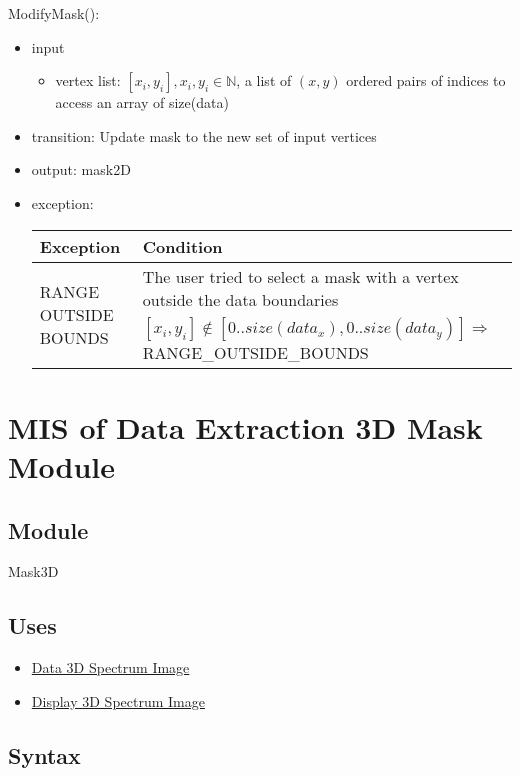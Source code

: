 \documentclass[12pt, titlepage]{article}
\begin{document}
\noindent ModifyMask():
\begin{itemize}
    \item input
    \begin{itemize}
        \item vertex list: $[x_i, y_i], x_i, y_i \in \mathbb{N}$, a list of $(x,y)$ ordered pairs of indices to access an array of size(data)
    \end{itemize}
    \item transition: Update mask to the new set of input vertices
    \item output: mask2D
    \item exception:
    \begin{center}
        \begin{tabular}{p{3.5cm} p{12cm}}
            \toprule[0.15em]
            \textbf{Exception} & \textbf{Condition}\\
            \midrule[0.1em]
            \multirow{2}{0.25\textwidth}{RANGE OUTSIDE BOUNDS} & The user tried to select a mask with a vertex outside the data boundaries\\ 
            & $[x_i, y_i] \notin [0..size(data_x), 0..size(data_y)] \Rightarrow$ RANGE\_OUTSIDE\_BOUNDS\\ 
            \bottomrule[0.15em]
        \end{tabular}
    \end{center}
\end{itemize}

\section{MIS of Data Extraction 3D Mask Module} \label{Mod:Mask3D}

\subsection{Module}

Mask3D

\subsection{Uses}
\begin{itemize}
    \item \hyperref[Mod:SI]{Data 3D Spectrum Image}
    \item \hyperref[Mod:Disp3D]{Display 3D Spectrum Image}
\end{itemize}

\subsection{Syntax}
\end{document}
